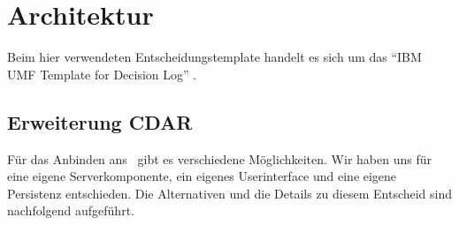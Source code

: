 \chapter{Architektur}

	Beim hier verwendeten Entscheidungstemplate handelt es sich um das "`IBM UMF Template for Decision Log"' \cite{hand_ibm_2008}.
	
	\section{Erweiterung CDAR}
		Für das Anbinden ans \cdar\ gibt es verschiedene Möglichkeiten.
		Wir haben uns für eine eigene Serverkomponente, ein eigenes Userinterface und eine eigene Persistenz entschieden.
		Die Alternativen und die Details zu diesem Entscheid sind nachfolgend aufgeführt.
		
